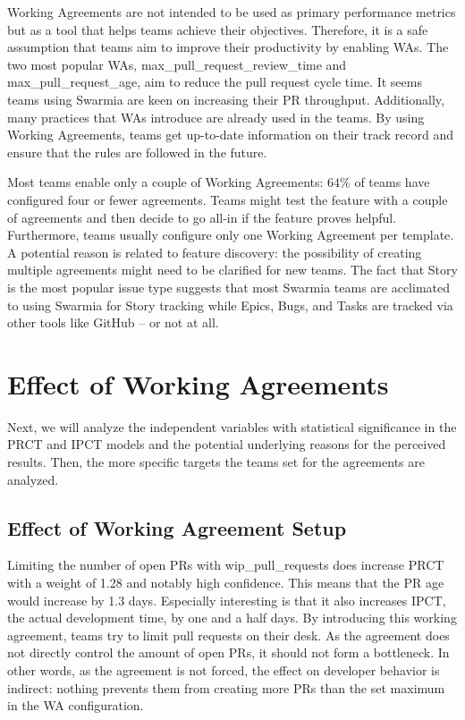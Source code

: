 Working Agreements are not intended to be used as primary performance metrics but as a tool that helps teams achieve their objectives. Therefore, it is a safe assumption that teams aim to improve their productivity by enabling WAs. The two most popular WAs, max\_pull\_request\_review\_time and max\_pull\_request\_age, aim to reduce the pull request cycle time. It seems teams using Swarmia are keen on increasing their PR throughput. Additionally, many practices that WAs introduce are already used in the teams. By using Working Agreements, teams get up-to-date information on their track record and ensure that the rules are followed in the future. 

Most teams enable only a couple of Working Agreements: $64\%$ of teams have configured four or fewer agreements. Teams might test the feature with a couple of agreements and then decide to go all-in if the feature proves helpful. Furthermore, teams usually configure only one Working Agreement per template. A potential reason is related to feature discovery: the possibility of creating multiple agreements might need to be clarified for new teams. The fact that Story is the most popular issue type suggests that most Swarmia teams are acclimated to using Swarmia for Story tracking while Epics, Bugs, and Tasks are tracked via other tools like GitHub – or not at all.

\section{Effect of Working Agreements}

Next, we will analyze the independent variables with statistical significance in the PRCT and IPCT models and the potential underlying reasons for the perceived results. Then, the more specific targets the teams set for the agreements are analyzed.

\subsection{Effect of Working Agreement Setup}

Limiting the number of open PRs with wip\_pull\_requests does increase PRCT with a weight of 1.28 and notably high confidence. This means that the PR age would increase by 1.3 days. Especially interesting is that it also increases IPCT, the actual development time, by one and a half days. By introducing this working agreement, teams try to limit pull requests on their desk. As the agreement does not directly control the amount of open PRs, it should not form a bottleneck. In other words, as the agreement is not forced, the effect on developer behavior is indirect: nothing prevents them from creating more PRs than the set maximum in the WA configuration. 

